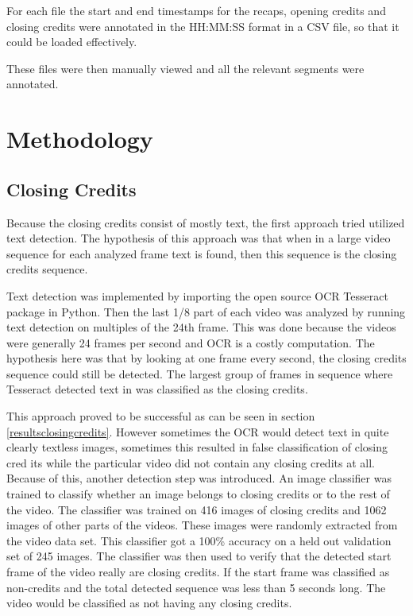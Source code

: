 \documentclass{article}
\begin{document}
For each file the start and end timestamps for the recaps, opening credits and closing credits were annotated in the HH:MM:SS format in a CSV file, so that it could be loaded effectively.

These files were then manually viewed and all the relevant segments were annotated. 

\section{Methodology} \label{methodology}

\subsection{Closing Credits}
Because the closing credits consist of mostly text, the first approach tried utilized text detection. The hypothesis of this approach was that when in a large video sequence for each analyzed frame text is found, then this sequence is the closing credits sequence.

Text detection was implemented by importing the open source OCR Tesseract package \cite{tesseract} in Python. Then the last 1/8 part of each video was analyzed by running text detection on multiples of the 24th frame. This was done because the videos were generally 24 frames per second and OCR is a costly computation. The hypothesis here was that by looking at one frame every second, the closing credits sequence could still be detected. The largest group of frames in sequence where Tesseract detected text in was classified as the closing credits.

This approach proved to be successful as can be seen in section \ref{resultsclosingcredits}. However sometimes the OCR would detect text in quite clearly textless images, sometimes this resulted in false classification of closing cred  its while the particular video did not contain any closing credits at all. Because of this, another detection step was introduced. An image classifier was trained to classify whether an image belongs to closing credits or to the rest of the video. The classifier was trained on 416 images of closing credits and 1062 images of other parts of the videos. These images were randomly extracted from the video data set. This classifier got a 100\% accuracy on a held out validation set of 245 images. The classifier was then used to verify that the detected start frame of the video really are closing credits. If the start frame was classified as non-credits and the total detected sequence was less than 5 seconds long. The video would be classified as not having any closing credits.
\end{document}
